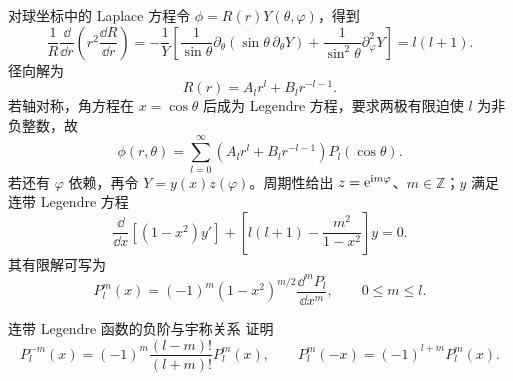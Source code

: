 对球坐标中的 Laplace 方程令 $\phi=R(r)Y(\theta,\varphi)$，得到
\[
 \frac1R\frac{\dd}{\dd r}\left(r^2\frac{\dd R}{\dd r}\right)
 =-\frac1Y\left[
 \frac1{\sin\theta}\partial_\theta(\sin\theta\,\partial_\theta Y)
 +\frac1{\sin^2\theta}\partial_\varphi^2Y\right]
 =l(l+1).
\]
径向解为
\[
 R(r)=A_lr^l+B_lr^{-l-1}.
\]
若轴对称，角方程在 $x=\cos\theta$ 后成为 Legendre 方程，要求两极有限迫使 $l$ 为非负整数，故
\[
 \phi(r,\theta)=\sum_{l=0}^\infty
 (A_lr^l+B_lr^{-l-1})P_l(\cos\theta).
\]
若还有 $\varphi$ 依赖，再令 $Y=y(x)z(\varphi)$。周期性给出
$z=\mathrm e^{\mathrm i m\varphi}$、$m\in\mathbb Z$；$y$ 满足连带 Legendre 方程
\[
 \frac{\dd}{\dd x}\left[(1-x^2)y'\right]
 +\left[l(l+1)-\frac{m^2}{1-x^2}\right]y=0.
\]
其有限解可写为
\[
 P_l^m(x)=(-1)^m(1-x^2)^{m/2}\frac{\dd^mP_l}{\dd x^m},
 \qquad 0\le m\le l.
\]


\begin{advexamplebox}{连带 Legendre 函数的负阶与宇称关系}\label{advA3:ex:associated-legendre}
证明
\[
 P_l^{-m}(x)=(-1)^m\frac{(l-m)!}{(l+m)!}P_l^m(x),
 \qquad P_l^m(-x)=(-1)^{l+m}P_l^m(x).
\]

\AQAssociatedLegendre
\end{advexamplebox}
\begin{advsolution}

\end{advsolution}
